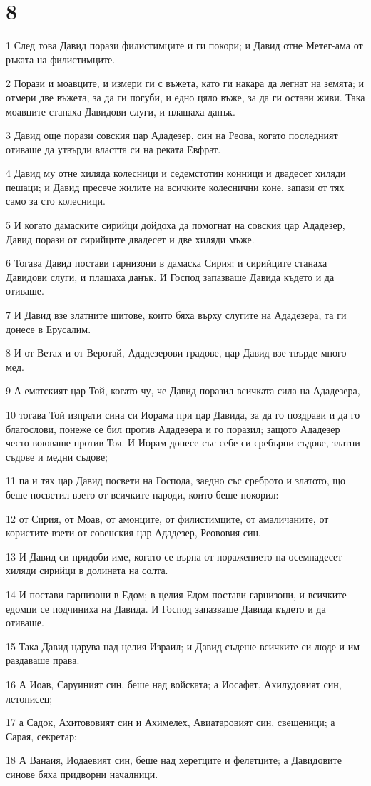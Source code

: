 \chapter{8}

\par 1 След това Давид порази филистимците и ги покори; и Давид отне Метег-ама от ръката на филистимците.
\par 2 Порази и моавците, и измери ги с въжета, като ги накара да легнат на земята; и отмери две въжета, за да ги погуби, и едно цяло въже, за да ги остави живи. Така моавците станаха Давидови слуги, и плащаха данък.
\par 3 Давид още порази совския цар Ададезер, син на Реова, когато последният отиваше да утвърди властта си на реката Евфрат.
\par 4 Давид му отне хиляда колесници и седемстотин конници и двадесет хиляди пешаци; и Давид пресече жилите на всичките колеснични коне, запази от тях само за сто колесници.
\par 5 И когато дамаските сирийци дойдоха да помогнат на совския цар Ададезер, Давид порази от сирийците двадесет и две хиляди мъже.
\par 6 Тогава Давид постави гарнизони в дамаска Сирия; и сирийците станаха Давидови слуги, и плащаха данък. И Господ запазваше Давида където и да отиваше.
\par 7 И Давид взе златните щитове, които бяха върху слугите на Ададезера, та ги донесе в Ерусалим.
\par 8 И от Ветах и от Веротай, Ададезерови градове, цар Давид взе твърде много мед.
\par 9 А ематският цар Той, когато чу, че Давид поразил всичката сила на Ададезера,
\par 10 тогава Той изпрати сина си Иорама при цар Давида, за да го поздрави и да го благослови, понеже се бил против Ададезера и го поразил; защото Ададезер често воюваше против Тоя. И Иорам донесе със себе си сребърни съдове, златни съдове и медни съдове;
\par 11 па и тях цар Давид посвети на Господа, заедно със среброто и златото, що беше посветил взето от всичките народи, които беше покорил:
\par 12 от Сирия, от Моав, от амонците, от филистимците, от амаличаните, от користите взети от совенския цар Ададезер, Реововия син.
\par 13 И Давид си придоби име, когато се върна от поражението на осемнадесет хиляди сирийци в долината на солта.
\par 14 И постави гарнизони в Едом; в целия Едом постави гарнизони, и всичките едомци се подчиниха на Давида. И Господ запазваше Давида където и да отиваше.
\par 15 Така Давид царува над целия Израил; и Давид съдеше всичките си люде и им раздаваше права.
\par 16 А Иоав, Саруиният син, беше над войската; а Иосафат, Ахилудовият син, летописец;
\par 17 а Садок, Ахитововият син и Ахимелех, Авиатаровият син, свещеници; а Сарая, секретар;
\par 18 А Ванаия, Иодаевият син, беше над херетците и фелетците; а Давидовите синове бяха придворни началници.

